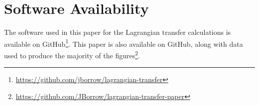 \section{Software Availability}

The software used in this paper for the Lagrangian transfer
calculations is available on GitHub\footnote{\url{https://github.com/jborrow/lagrangian-transfer}}. This paper is also available on
GitHub, along with data used to produce the majority of
the figures\footnote{\url{https://github.com/JBorrow/lagrangian-transfer-paper}}.
